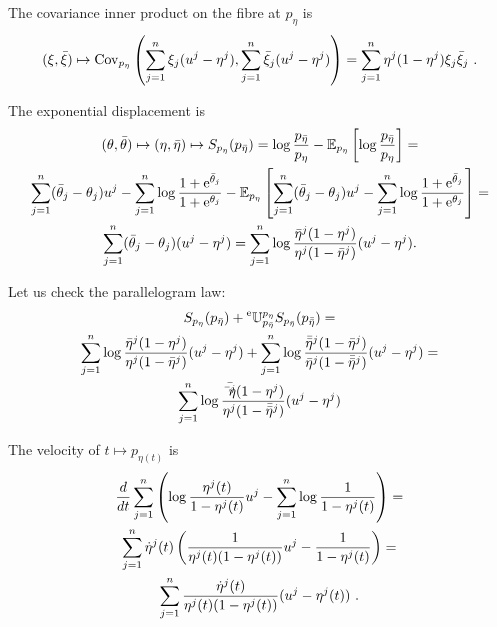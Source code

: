 \documentclass[12pt,a4paper]{amsart}
\begin{document}
The covariance inner product on the fibre at $p_\eta$ is
\begin{equation}
  \label{eq:29}
(\xi, \bar \xi) \mapsto  \operatorname{Cov}_{p_\eta}\left(\sum_{j=1}^n \xi_j (u^j - \eta^j),\sum_{j=1}^n \bar \xi_j(u^j-\eta^j)\right) = \sum_{j=1}^n \eta^j(1-\eta^j) \xi_j \bar \xi_j \ .
\end{equation}

The exponential displacement is
\begin{multline}
  \label{eq:30}
  (\theta,\bar \theta) \mapsto (\eta,\bar \eta) \mapsto
  S_{p_\eta}(p_{\bar\eta}) = \log \frac {p_{\bar\eta}}{p_{\eta}} - \operatorname{\mathbb E}_{p_\eta}\left[\log \frac {p_{\bar\eta}}{p_{\eta}}\right] = \\
  \sum_{j=1}^n (\bar \theta_j - \theta_j) u^j - \sum_{j=1}^n \log \frac {1 + \mathrm{e}^{\bar\theta_j}}{1 + \mathrm{e}^{\theta_j}} - \operatorname{\mathbb E}_{p_\eta}\left[ \sum_{j=1}^n (\bar \theta_j - \theta_j) u^j - \sum_{j=1}^n \log \frac {1 + \mathrm{e}^{\bar\theta_j}}{1 + \mathrm{e}^{\theta_j}}\right] = \\
  \sum_{j=1}^n (\bar \theta_j - \theta_j)(u^j - \eta^j) = \sum_{j=1}^n \log \frac {\bar \eta^j(1 - \eta^j)}{\eta^j (1- \bar \eta^j)} (u^j - \eta^j) .
\end{multline}

Let us check the parallelogram law:
\begin{multline}
  \label{eq:31}
  S_{p_\eta}(p_{\bar\eta}) + \prescript{\text{e}}{} {\mathbb U} _ {p_{\bar\eta}} ^ {p_\eta} S_{p_{\bar\eta}}(p_{\bar{\bar\eta}}) = \\ 
  \sum_{j=1}^n \log \frac {\bar \eta^j(1 - \eta^j)}{\eta^j (1- \bar \eta^j)} (u^j - \eta^j) + \sum_{j=1}^n \log \frac {\bar {\bar\eta}^j(1 - \bar \eta^j)}{\bar \eta^j (1- \bar{\bar \eta}^j)} (u^j - \eta^j) = \\
  \sum_{j=1}^n \log \frac {\bar{\bar\eta^j}(1 - \eta^j)}{\eta^j (1- \bar{\bar\eta}^j)} (u^j - \eta^j) 
\end{multline}

The velocity of $t \mapsto p_{\eta(t)}$ is
\begin{multline}
  \label{eq:32}
  \frac{d}{dt} \sum_{j=1}^n \left(\log \frac{\eta^j(t)}{1-\eta^j(t)} u^j - \sum_{j=1}^n \log \frac 1 {1 - \eta^j(t)}\right) = \\
  \sum_{j=1}^n \dot \eta^j(t) \left(\frac 1 {\eta^j(t)(1 - \eta^j(t))}u^j - \frac 1 {1 - \eta^j(t)}\right) = \\
    \sum_{j=1}^n \frac{\dot \eta^j(t)}{\eta^j(t)(1 - \eta^j(t))} (u^j - \eta^j(t)) \ .
\end{multline}
\end{document}
